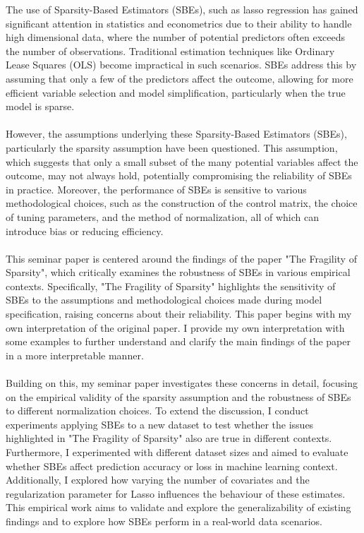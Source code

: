 The use of Sparsity-Based Estimators (SBEs), such as lasso regression has gained significant attention in statistics and econometrics due to their ability to handle high dimensional data, where the number of potential predictors often exceeds the number of observations. Traditional estimation techniques like Ordinary Lease Squares (OLS) become impractical in such scenarios. SBEs address this by assuming that only a few of the predictors affect the outcome, allowing for more efficient variable selection and model simplification, particularly when the true model is sparse.\\
\\
However, the assumptions underlying these Sparsity-Based Estimators (SBEs), particularly the sparsity assumption have been questioned. This assumption, which suggests that only a small subset of the many potential variables affect the outcome, may not always hold, potentially compromising the reliability of SBEs in practice. Moreover, the performance of SBEs is sensitive to various methodological choices, such as the construction of the control matrix, the choice of tuning parameters, and the method of normalization, all of which can introduce bias or reducing efficiency. \\
\\
This seminar paper is centered around the findings of the paper "The Fragility of Sparsity", which critically examines the robustness of SBEs in various empirical contexts. Specifically, "The Fragility of Sparsity" highlights the sensitivity of SBEs to the assumptions and methodological choices made during model specification, raising concerns about their reliability. This paper begins with my own interpretation of the original paper. I provide my own interpretation with some examples to further understand and clarify the main findings of the paper in a more interpretable manner. \\
\\
Building on this, my seminar paper investigates these concerns in detail, focusing on the empirical validity of the sparsity assumption and the robustness of SBEs to different normalization choices. To extend the discussion, I conduct experiments applying SBEs to a new dataset to test whether the issues highlighted in "The Fragility of Sparsity" also are true in different contexts. Furthermore, I experimented with different dataset sizes and aimed to evaluate whether SBEs affect prediction accuracy or loss in machine learning context. Additionally, I explored how varying the number of covariates and the regularization parameter for Lasso influences the behaviour of these estimates. This empirical work aims to validate and explore the generalizability of existing findings and to explore how SBEs perform in a real-world data scenarios.

